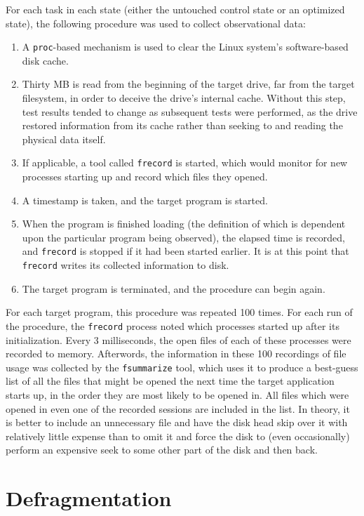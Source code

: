 \documentclass[10pt,twocolumn,letterpaper]{article}
\begin{document}
For each task in each state (either the untouched control state or an optimized state), the
following procedure was used to collect observational data:
\begin{enumerate}
\item A \texttt{proc}-based mechanism is used to clear the Linux system's software-based disk cache.
\item Thirty MB is read from the beginning of the target drive, far from the target filesystem, in order to deceive the drive's internal cache. Without this step, test results tended to change as subsequent tests were performed, as the drive restored information from its cache rather than seeking to and reading the physical data itself.
\item If applicable, a tool called \texttt{frecord} is started, which would monitor for new processes starting up and record which
files they opened.
\item A timestamp is taken, and the target program is started.
\item When the program is finished loading (the definition of which is dependent upon the particular program being observed), the elapsed time is recorded, and \texttt{frecord} is stopped if it had been started earlier. It is at this
point that \texttt{frecord} writes its collected information to disk.
\item The target program is terminated, and the procedure can begin again.
\end{enumerate}

For each target program, this procedure was repeated 100 times. For each run of the procedure, the \texttt{frecord}
process noted which processes started up after its initialization. Every 3 milliseconds, the open files of each
of these processes were recorded to memory. Afterwords, the information in these 100 recordings of file usage
was collected by the \texttt{fsummarize} tool, which uses it to produce a best-guess list of all the files
that might be opened the next time the target application starts up, in the order they are most likely to be
opened in. All files which were opened in even one of the recorded sessions are included in the list. In theory,
it is better to include an unnecessary file and have the disk head skip over it with relatively little expense than to omit it and force the disk to (even occasionally) perform an expensive seek to some other part of the disk
and then back.

\section{Defragmentation}
\end{document}
